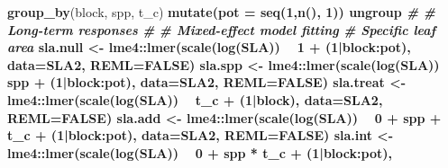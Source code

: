 \documentclass[]{scrartcl}
\newenvironment{Shaded}{\begin{snugshade}}{\end{snugshade}}
\newcommand{\CommentTok}[1]{\textcolor[rgb]{0.56,0.35,0.01}{\textit{#1}}}
\newcommand{\DataTypeTok}[1]{\textcolor[rgb]{0.13,0.29,0.53}{#1}}
\newcommand{\DecValTok}[1]{\textcolor[rgb]{0.00,0.00,0.81}{#1}}
\newcommand{\KeywordTok}[1]{\textcolor[rgb]{0.13,0.29,0.53}{\textbf{#1}}}
\newcommand{\NormalTok}[1]{#1}
\newcommand{\OperatorTok}[1]{\textcolor[rgb]{0.81,0.36,0.00}{\textbf{#1}}}
\newcommand{\OtherTok}[1]{\textcolor[rgb]{0.56,0.35,0.01}{#1}}
\newcommand{\StringTok}[1]{\textcolor[rgb]{0.31,0.60,0.02}{#1}}
\begin{document}
\begin{Shaded}
\begin{Highlighting}[]
{{{{{{{{{{{{{{{{{{{{{{{{{{{{{{{{{{{{{{{{{{\StringTok{            }\KeywordTok{group_by}\NormalTok{(block, spp, t_c) }\OperatorTok{%
\StringTok{             }\KeywordTok{mutate}\NormalTok{(}\DataTypeTok{pot =} \KeywordTok{seq}\NormalTok{(}\DecValTok{1}\NormalTok{,}\KeywordTok{n}\NormalTok{(), }\DecValTok{1}\NormalTok{)) }\OperatorTok{%
\StringTok{            }\NormalTok{ungroup }
\CommentTok{#}
\CommentTok{#  Long-term responses}
\CommentTok{#}
\CommentTok{# Mixed-effect model fitting}
  \CommentTok{# Specific leaf area}
\NormalTok{    sla.null <-}\StringTok{ }\NormalTok{lme4}\OperatorTok{::}\KeywordTok{lmer}\NormalTok{(}\KeywordTok{scale}\NormalTok{(}\KeywordTok{log}\NormalTok{(SLA)) }\OperatorTok{~}\StringTok{ }\DecValTok{1} \OperatorTok{+}\StringTok{ }\NormalTok{(}\DecValTok{1}\OperatorTok{|}\NormalTok{block}\OperatorTok{:}\NormalTok{pot), }
                           \DataTypeTok{data=}\NormalTok{SLA2, }\DataTypeTok{REML=}\OtherTok{FALSE}\NormalTok{)}
\NormalTok{    sla.spp <-}\StringTok{ }\NormalTok{lme4}\OperatorTok{::}\KeywordTok{lmer}\NormalTok{(}\KeywordTok{scale}\NormalTok{(}\KeywordTok{log}\NormalTok{(SLA)) }\OperatorTok{~}\StringTok{ }\NormalTok{spp }\OperatorTok{+}\StringTok{ }\NormalTok{(}\DecValTok{1}\OperatorTok{|}\NormalTok{block}\OperatorTok{:}\NormalTok{pot), }
                          \DataTypeTok{data=}\NormalTok{SLA2, }\DataTypeTok{REML=}\OtherTok{FALSE}\NormalTok{)}
\NormalTok{    sla.treat <-}\StringTok{ }\NormalTok{lme4}\OperatorTok{::}\KeywordTok{lmer}\NormalTok{(}\KeywordTok{scale}\NormalTok{(}\KeywordTok{log}\NormalTok{(SLA)) }\OperatorTok{~}\StringTok{ }\NormalTok{t_c }\OperatorTok{+}\StringTok{ }\NormalTok{(}\DecValTok{1}\OperatorTok{|}\NormalTok{block), }
                            \DataTypeTok{data=}\NormalTok{SLA2, }\DataTypeTok{REML=}\OtherTok{FALSE}\NormalTok{)}
\NormalTok{    sla.add <-}\StringTok{ }\NormalTok{lme4}\OperatorTok{::}\KeywordTok{lmer}\NormalTok{(}\KeywordTok{scale}\NormalTok{(}\KeywordTok{log}\NormalTok{(SLA)) }\OperatorTok{~}\StringTok{ }\DecValTok{0} \OperatorTok{+}\StringTok{ }\NormalTok{spp }\OperatorTok{+}\StringTok{ }\NormalTok{t_c }\OperatorTok{+}\StringTok{ }\NormalTok{(}\DecValTok{1}\OperatorTok{|}\NormalTok{block}\OperatorTok{:}\NormalTok{pot), }
                          \DataTypeTok{data=}\NormalTok{SLA2, }\DataTypeTok{REML=}\OtherTok{FALSE}\NormalTok{)}
\NormalTok{    sla.int <-}\StringTok{ }\NormalTok{lme4}\OperatorTok{::}\KeywordTok{lmer}\NormalTok{(}\KeywordTok{scale}\NormalTok{(}\KeywordTok{log}\NormalTok{(SLA)) }\OperatorTok{~}\StringTok{ }\DecValTok{0} \OperatorTok{+}\StringTok{ }\NormalTok{spp }\OperatorTok{*}\StringTok{ }\NormalTok{t_c }\OperatorTok{+}\StringTok{ }\NormalTok{(}\DecValTok{1}\OperatorTok{|}\NormalTok{block}\OperatorTok{:}\NormalTok{pot), }
}}}}}}}}}}}}}}}}}}}}}}}}}}}}}}}}}}}}}}}}}}}}
\end{Highlighting}
\end{Shaded}
\end{document}
